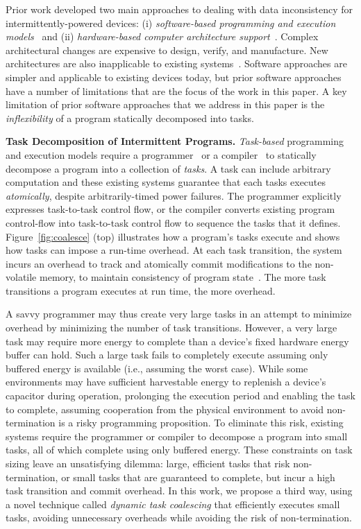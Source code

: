 Prior work developed two main approaches to dealing with data inconsistency for
intermittently-powered devices: (i) \emph{software-based programming and
execution models}~\citep{dino,ratchet,chain,alpaca} and (ii)
\emph{hardware-based computer architecture
support}~\citep{hicks_isca_2017,idetic,nvp}.  Complex architectural changes are
expensive to design, verify, and manufacture.  New architectures are also
inapplicable to existing systems~\citep{hicks_isca_2017,nvp}. Software
approaches are simpler and applicable to existing devices today, but prior
software approaches have a number of limitations that are the focus of the work
in this paper.  A key limitation of prior software approaches that we address in this paper is the {\em inflexibility} of a program statically decomposed into tasks. 

\textbf{Task Decomposition of Intermittent Programs.} {\em
Task-based} programming and execution models require a
programmer~\citep{alpaca,chain} or a compiler~\cite{baghsorkhi_cgo_2018} to
statically decompose a program into a collection of {\em tasks}.  A task can
include arbitrary computation and these existing systems guarantee that each
tasks executes {\em atomically}, despite arbitrarily-timed power failures.  
%
The programmer explicitly expresses task-to-task control flow, or the compiler
converts existing program control-flow into task-to-task control flow to sequence 
the tasks that it defines.
%
Figure~\ref{fig:coalesce} (top) illustrates how a program's tasks execute and
shows how tasks can impose a run-time overhead. 
%
At each task transition, the system incurs an overhead to track and atomically
commit modifications to the non-volatile memory, to maintain consistency of
program state~\citep{chain,alpaca}.  
%
The more task transitions a program executes at run time, the more overhead.

A savvy programmer may thus create very large tasks in an attempt to minimize
overhead by minimizing the number of task transitions.  However, a very large
task may require more energy to complete than a device's fixed hardware energy
buffer can hold.  Such a large task fails to completely execute assuming only
buffered energy is available (i.e., assuming the worst case).  While some
environments may have sufficient harvestable energy to replenish a device's
capacitor during operation, prolonging the execution period and enabling the
task to complete, assuming cooperation from the physical environment to avoid
non-termination is a risky programming proposition.  To eliminate this risk,
existing systems require the programmer or compiler to decompose a  program
into small tasks, all of which complete using only buffered energy.  These
constraints on task sizing leave an unsatisfying dilemma: large, efficient
tasks that risk non-termination, or small tasks that are guaranteed to
complete, but incur a high task transition and commit overhead.  In this work,
we propose a third way, using a novel technique called {\em dynamic task
coalescing} that efficiently executes small tasks, avoiding unnecessary
overheads while avoiding the risk of non-termination.

